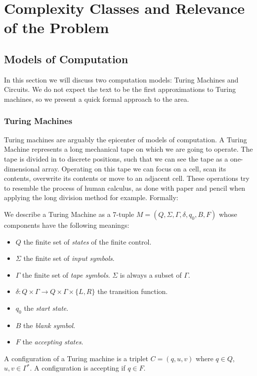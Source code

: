 \chapter{Complexity Classes and Relevance of the Problem}
\section{Models of Computation}
In this section we will discuss two computation models: Turing Machines and Circuits. We do not expect the text to be the first approximations to Turing machines, so we present a quick formal approach to the area. 

\subsection{Turing Machines}
Turing machines are arguably the epicenter of  models of computation. A Turing Machine  represents a long mechanical tape on which we are going to operate. The tape is divided in to discrete positions, such that we can see the tape as a one-dimensional array. Operating on this tape we can focus on a cell, scan its contents, overwrite  its contents or move to an adjacent cell. These operations try to resemble the process of human calculus, as done with paper and pencil when applying the long division method  for example. Formally:

\begin{definition} We describe a Turing Machine as a 7-tuple $M=(Q, \Sigma, \Gamma, \delta, q_0, B, F)$ whose components have the following meanings:
  \begin{itemize}
  \item $Q$ the finite set of \emph{states} of the finite control.
  \item $\Sigma$ the finite set of \emph{input symbols}.
  \item $\Gamma$ the finite set of \emph{tape symbols}. $\Sigma$ is always a subset of $\Gamma$.
  \item  $\delta: Q\times \Gamma \to Q\times\Gamma\times\{L,R\}$ the transition function.
  \item $q_0$ the \emph{start state}.
  \item $B$ the \emph{blank symbol}.
  \item $F$ the \emph{accepting states}.
  \end{itemize}

  A configuration of a Turing machine is a triplet $C=(q,u,v)$ where $q\in Q$, $u,v\in \Gamma^*$. A configuration is accepting if $q\in F$.
\end{definition}

